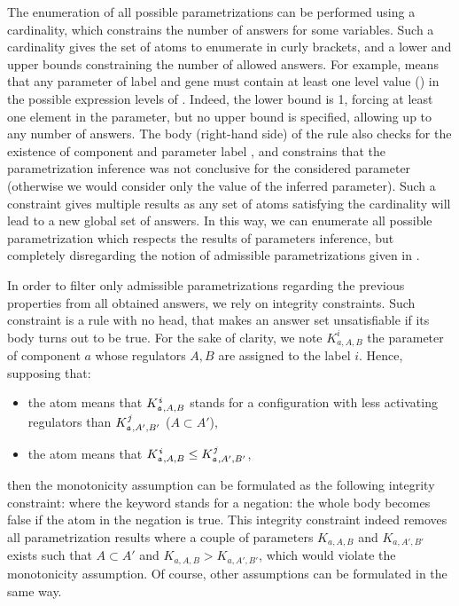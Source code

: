 The enumeration of all possible parametrizations can be performed using a cardinality, which constrains the number of answers for some variables.
Such a cardinality gives the set of atoms to enumerate in curly brackets, and a lower and upper bounds constraining the number of allowed answers.
For example,
means that any parameter of label  and gene  must contain at least one level value () in the possible expression levels of .
Indeed, the lower bound is 1, forcing at least one element in the parameter, but no upper bound is specified, allowing up to any number of answers.
The body (right-hand side) of the rule also checks for the existence of component  and parameter label , and constrains that the parametrization inference was not conclusive for the considered parameter (otherwise we would consider only the value of the inferred parameter).
Such a constraint gives multiple results as any set of atoms satisfying the cardinality will lead to a new global set of answers.
In this way, we can enumerate all possible parametrization which respects the results of parameters
inference, but completely disregarding the notion of admissible parametrizations given in
.

In order to filter only admissible parametrizations regarding the previous properties from all obtained answers, we rely on integrity constraints.
Such constraint is a rule with no head, that makes an answer set unsatisfiable if its body turns out to be true.
For the sake of clarity, we note $K^i_{a,A,B}$ the parameter of component $a$ whose regulators $A,B$ are assigned to the label $i$. Hence, supposing that:
\begin{itemize}
  \item the  atom means that $K^{\texttt{\textit{i}}}_{\texttt{\textit{a}},A,B}$ stands for a configuration with less activating regulators than $K^{\texttt{\textit{j}}}_{\texttt{\textit{a}},A',B'}$ (\ie $A \subset A'$),
  \item the  atom means that $K^{\texttt{\textit{i}}}_{\texttt{\textit{a}},A,B} \leq K^{\texttt{\textit{j}}}_{\texttt{\textit{a}},A',B'}$,
\end{itemize}
then the monotonicity assumption can be formulated as the following integrity constraint:
where the  keyword stands for a negation: the whole body becomes false if the atom in the negation is true. This integrity constraint indeed removes all parametrization results where a couple of parameters $K_{a,A,B}$ and $K_{a,A',B'}$ exists such that $A \subset A'$ and $K_{a,A,B} > K_{a,A',B'}$, which would violate the monotonicity assumption. Of course, other assumptions can be formulated in the same way.

